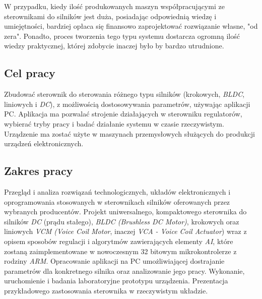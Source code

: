 W przypadku, kiedy ilość produkowanych maszyn współpracującymi ze sterownikami do silników jest duża, posiadając odpowiednią wiedzę i umiejętności, bardziej opłaca się finansowo zaprojektować rozwiązanie własne, "od zera". Ponadto, proces tworzenia tego typu systemu dostarcza ogromną ilość wiedzy praktycznej, której zdobycie inaczej było by bardzo utrudnione.
  
\subsection*{Cel pracy}
Zbudować sterownik do sterowania różnego typu silników (krokowych, {\it BLDC}, liniowych i {\it DC}), z możliwością dostosowywania parametrów, używając aplikacji PC. Aplikacja ma pozwalać strojenie działających w sterowniku regulatorów, wybierać tryby pracy i badać działanie systemu w czasie rzeczywistym. Urządzenie ma zostać użyte w maszynach przemysłowych służących do produkcji urządzeń elektronicznych.

\subsection*{Zakres pracy}
Przegląd i analiza rozwiązań technologicznych, układów elektronicznych i oprogramowania stosowanych w sterownikach silników oferowanych przez wybranych producentów. Projekt uniwersalnego, kompaktowego sterownika do silników {\it DC} (prądu stałego), {\it BLDC (Brushless DC Motor)}, krokowych oraz liniowych {\it VCM (Voice Coil Motor}, inaczej {\it VCA - Voice Coil Actuator}) wraz z opisem sposobów regulacji i algorytmów zawierających elementy {\it AI}, które zostaną zaimplementowane w nowoczesnym 32 bitowym mikrokontrolerze z rodziny {\it ARM}. Opracowanie aplikacji na PC umożliwiającej dostrajanie parametrów dla konkretnego silnika oraz analizowanie jego pracy. Wykonanie, uruchomienie i badania laboratoryjne prototypu urządzenia. Prezentacja przykładowego zastosowania sterownika w rzeczywistym układzie.

\clearpage

